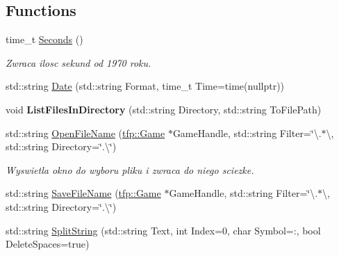 \subsection*{Functions}
\begin{DoxyCompactItemize}
\item 
\mbox{\label{namespacetfp_a335f3090b47c35efa78618ed7442a989}} 
time\+\_\+t \mbox{\hyperlink{namespacetfp_a335f3090b47c35efa78618ed7442a989}{Seconds}} ()
\begin{DoxyCompactList}\small\item\em Zwraca ilosc sekund od 1970 roku. \end{DoxyCompactList}\item 
std\+::string \mbox{\hyperlink{namespacetfp_aab9c5625cca52707bd8c9c24f331a564}{Date}} (std\+::string Format, time\+\_\+t Time=time(nullptr))
\item 
\mbox{\label{namespacetfp_ac66771aedc99f0fc562224858438c628}} 
void {\bfseries List\+Files\+In\+Directory} (std\+::string Directory, std\+::string To\+File\+Path)
\item 
\mbox{\label{namespacetfp_afc55660d969aade0a42d8ba7d871a63f}} 
std\+::string \mbox{\hyperlink{namespacetfp_afc55660d969aade0a42d8ba7d871a63f}{Open\+File\+Name}} (\mbox{\hyperlink{classtfp_1_1_game}{tfp\+::\+Game}} $\ast$Game\+Handle, std\+::string Filter=\char`\"{}\textbackslash{}.$\ast$\textbackslash{}, std\+::string Directory=\char`\"{}.\textbackslash{}\char`\"{})
\begin{DoxyCompactList}\small\item\em Wyswietla okno do wyboru pliku i zwraca do niego sciezke. \end{DoxyCompactList}\item 
std\+::string \mbox{\hyperlink{namespacetfp_aaa8d845d24a60e21835915c3c0a93403}{Save\+File\+Name}} (\mbox{\hyperlink{classtfp_1_1_game}{tfp\+::\+Game}} $\ast$Game\+Handle, std\+::string Filter=\char`\"{}\textbackslash{}.$\ast$\textbackslash{}, std\+::string Directory=\char`\"{}.\textbackslash{}\char`\"{})
\item 
\mbox{\label{namespacetfp_a4074a9f0c34b856a2a13259868265f1d}} 
std\+::string \mbox{\hyperlink{namespacetfp_a4074a9f0c34b856a2a13259868265f1d}{Split\+String}} (std\+::string Text, int Index=0, char Symbol=\textquotesingle{}\+:\textquotesingle{}, bool Delete\+Spaces=true)

\end{DoxyCompactItemize}
